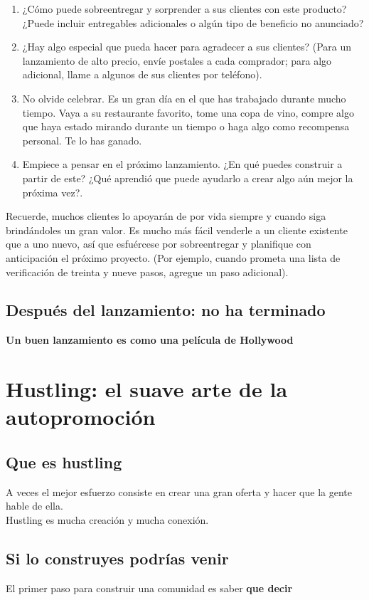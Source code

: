 \documentclass[10pt]{book}
\begin{document}
\begin{enumerate}[\bfseries 1.]
		\item ¿Cómo puede sobreentregar y sorprender a sus clientes con este producto? ¿Puede incluir entregables adicionales o algún tipo de beneficio no anunciado?
		\item ¿Hay algo especial que pueda hacer para agradecer a sus clientes? (Para un lanzamiento de alto precio, envíe postales a cada comprador; para algo adicional, llame a algunos de sus clientes por teléfono).
		\item No olvide celebrar. Es un gran día en el que has trabajado durante mucho tiempo. Vaya a su restaurante favorito, tome una copa de vino, compre algo que haya estado mirando durante un tiempo o haga algo como recompensa personal. Te lo has ganado.
		\item Empiece a pensar en el próximo lanzamiento. ¿En qué puedes construir a partir de este? ¿Qué aprendió que puede ayudarlo a crear algo aún mejor la próxima vez?.

	\end{enumerate}
	    Recuerde, muchos clientes lo apoyarán de por vida siempre y cuando siga brindándoles un gran valor. Es mucho más fácil venderle a un cliente existente que a uno nuevo, así que esfuércese por sobreentregar y planifique con anticipación el próximo proyecto. (Por ejemplo, cuando prometa una lista de verificación de treinta y nueve pasos, agregue un paso adicional).

    \section{Después del lanzamiento: no ha terminado}
    \textbf{Un buen lanzamiento es como una película de Hollywood}

\chapter{Hustling: el suave arte de la autopromoción}
    \section{Que es hustling} 
	A veces el mejor esfuerzo consiste en crear una gran oferta y hacer que la gente hable de ella.\\
	Hustling es mucha creación y mucha conexión.

    \section{Si lo construyes podrías venir}	
	El primer paso para construir una comunidad es saber \textbf{que decir}
\end{document}
